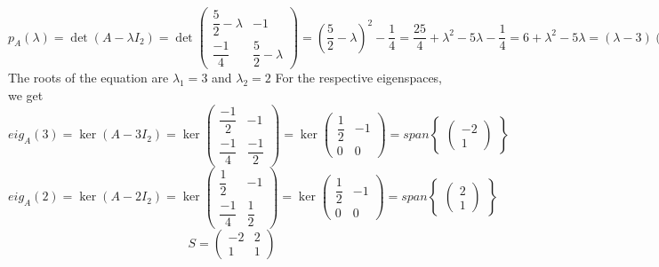 \documentclass{article}
\begin{document}
\begin{equation*} p_A(\lambda) = \det(A-\lambda I_2) = \det\begin{pmatrix} \dfrac{5}{2} - \lambda & -1 \\[9pt] \dfrac{-1}{4} & \dfrac{5}{2} - \lambda \end{pmatrix} = {\left(\frac{5}{2}-\lambda\right)}^{2} - \frac{1}{4} = \frac{25}{4} + \lambda^{2} - 5\lambda - \frac{1}{4} = 6 + \lambda^{2} -5\lambda = (\lambda-3)(\lambda-2) \end{equation*}
The roots of the equation are $\lambda_1 = 3$ and $\lambda_2 = 2$ \newline
For the respective eigenspaces, we get \newline
\begin{equation*} eig_A(3) = \ker(A-3I_2) = \ker\begin{pmatrix} \dfrac{-1}{2} & -1 \\[9pt] \dfrac{-1}{4} & \dfrac{-1}{2}\end{pmatrix} = \ker\begin{pmatrix} \dfrac{1}{2} & -1 \\[9pt] 0 & 0\end{pmatrix} = span\begin{Bmatrix}\begin{pmatrix} -2 \\1 \end{pmatrix}\end{Bmatrix} \end{equation*}
\begin{equation*} eig_A(2) = \ker(A-2I_2) = \ker\begin{pmatrix} \dfrac{1}{2} & -1 \\[9pt] \dfrac{-1}{4} & \dfrac{1}{2}\end{pmatrix} = \ker\begin{pmatrix} \dfrac{1}{2} & -1 \\[9pt] 0 & 0\end{pmatrix} = span\begin{Bmatrix}\begin{pmatrix} 2 \\1 \end{pmatrix}\end{Bmatrix} \end{equation*}
\begin{equation*} S = \begin{pmatrix} -2 & 2 \\ 1 & 1 \end{pmatrix}\end{equation*}
\end{document}
